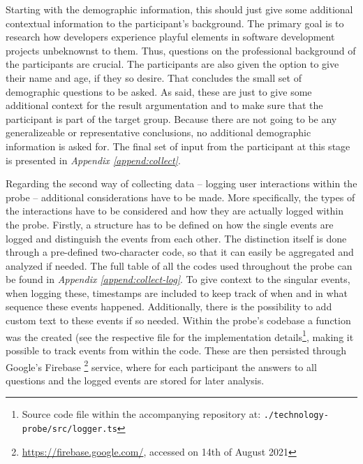Starting with the demographic information, this should just give some additional contextual information to the participant's background. The primary goal is to research how developers experience playful elements in software development projects unbeknownst to them. Thus, questions on the professional background of the participants are crucial. The participants are also given the option to give their name and age, if they so desire. That concludes the small set of demographic questions to be asked. As said, these are just to give some additional context for the result argumentation and to make sure that the participant is part of the target group. Because there are not going to be any generalizeable or representative conclusions, no additional demographic information is asked for. The final set of input from the participant at this stage is presented in \textit{Appendix \ref{append:collect}}.

Regarding the second way of collecting data -- logging user interactions within the probe -- additional considerations have to be made. More specifically, the types of the interactions have to be considered and how they are actually logged within the probe. Firstly, a structure has to be defined on how the single events are logged and distinguish the events from each other. The distinction itself is done through a pre-defined two-character code, so that it can easily be aggregated and analyzed if needed. The full table of all the codes used throughout the probe can be found in \textit{Appendix \ref{append:collect-log}}. To give context to the singular events, when logging these, timestamps are included to keep track of when and in what sequence these events happened. Additionally, there is the possibility to add custom text to these events if so needed. Within the probe's codebase a function was the created (see the respective file for the implementation details\footnote{Source code file within the accompanying repository at: \texttt{./technology-probe/src/logger.ts}}, making it possible to track events from within the code. These are then persisted through Google's Firebase \footnote{\url{https://firebase.google.com/}, accessed on 14th of August 2021} service, where for each participant the answers to all questions and the logged events are stored for later analysis.


